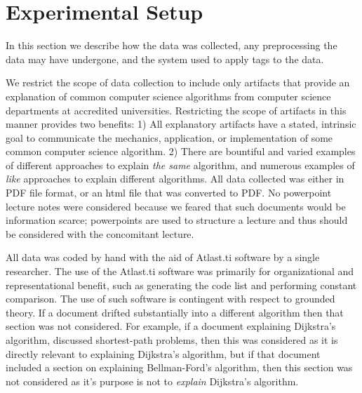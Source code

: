 \documentclass[sigconf]{acmart}
\begin{document}

\section{Experimental Setup}
\label{sec:exp:data}
In this section we describe how the data was collected, any preprocessing the
data may have undergone, and the system used to apply tags to the data. 

We restrict the scope of data collection to include only artifacts that provide
an explanation of common computer science algorithms from computer science
departments at accredited universities. Restricting the scope of artifacts in
this manner provides two benefits: 1) All explanatory artifacts have a stated,
intrinsic goal to communicate the mechanics, application, or implementation of
some common computer science algorithm. 2) There are bountiful and varied
examples of different approaches to explain \emph{the same} algorithm, and
numerous examples of \emph{like} approaches to explain different algorithms. All
data collected was either in PDF file format, or an html file that was converted
to PDF. No powerpoint lecture notes were considered because we feared that such
documents would be information scarce; powerpoints are used to structure a
lecture and thus should be considered with the concomitant lecture.

All data was coded by hand with the aid of Atlast.ti software \cite{atlast} by a
single researcher. The use of the Atlast.ti software was primarily for
organizational and representational benefit, such as generating the code list
and performing constant comparison.
%
The use of such software is contingent with respect to grounded theory.
%
If a document drifted substantially into a different algorithm then that section
was not considered. For example, if a document explaining Dijkstra's algorithm,
discussed shortest-path problems, then this was considered as it is directly
relevant to explaining Dijkstra's algorithm, but if that document included a
section on explaining Bellman-Ford's algorithm, then this section was not
considered as it's purpose is not to \emph{explain} Dijkstra's algorithm.
\end{document}
